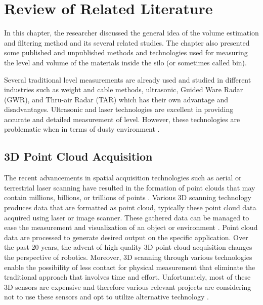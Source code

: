 \renewcommand{\thechapter}{\Roman{chapter}}
\chapter{Review of Related Literature}
\renewcommand{\thechapter}{\arabic{chapter}}
\label{ch:rrl}
\thispagestyle{empty}

In this chapter, the researcher discussed the general idea of the volume estimation and filtering method and its several related studies. The chapter also presented some published and unpublished methods and technologies used for measuring the level and volume of the materials inside the silo (or sometimes called bin).

Several traditional level measurements are already used and studied in different industries such as weight and cable methods, ultrasonic, Guided Ware Radar (GWR), and Thru-air Radar (TAR) which has their own advantage and disadvantages. Ultrasonic and laser technologies are excellent in providing accurate and detailed measurement of level. However, these technologies are problematic when in terms of dusty environment \citep{duysak2020}.

\section{3D Point Cloud Acquisition}
\label{rrl:sec:3D Point Cloud acquisition}
The recent advancements in spatial acquisition technologies such as aerial or terrestrial laser scanning have resulted in the formation of point clouds that may contain millions, billions, or trillions of points \citep{jaboyedoff2012}. Various 3D scanning technology produces data that are formatted as point cloud, typically these point cloud data acquired using laser or image scanner. These gathered data can be managed to ease the measurement and visualization of an object or environment \citep{chua2017}. Point cloud data are processed to generate desired output on the specific application. Over the past 20 years, the advent of high-quality 3D point cloud acquisition changes the perspective of robotics. Moreover, 3D scanning through various technologies enable the possibility of less contact for physical measurement that eliminate the traditional approach that involves time and effort. Unfortunately, most of these 3D sensors are expensive and therefore various relevant projects are considering not to use these sensors and opt to utilize alternative technology \citep{rusu2011}.

